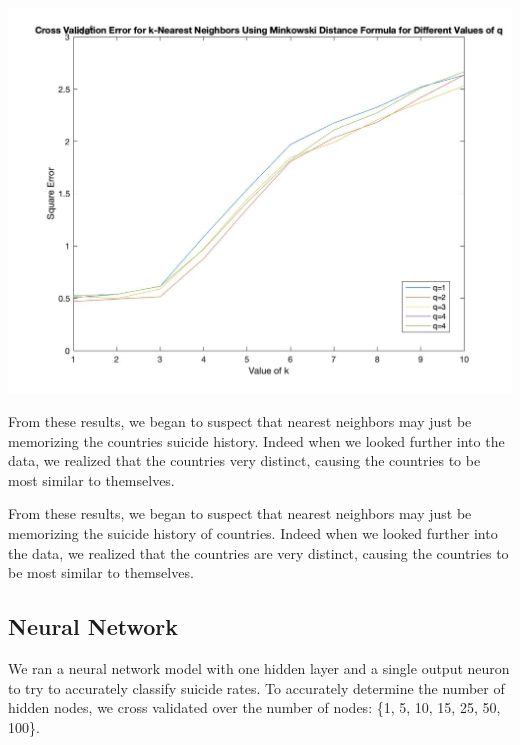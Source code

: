 \documentclass{article}
\begin{document}
\begin{multicols}{2}
\begingroup
    \includegraphics[width=\columnwidth]{../Figures/k_nn_err_cv_minkowski.jpg}
    \begin{spacing}{1.2}
    \label{fig:a} 
    \end{spacing}
\endgroup


From these results, we began to suspect that nearest neighbors may just be memorizing the countries suicide history. Indeed when we looked further into the data, we realized that the countries very distinct, causing the countries to be most similar to themselves.

From these results, we began to suspect that nearest neighbors may just be memorizing the suicide history of countries. Indeed when we looked further into the data, we realized that the countries are very distinct, causing the countries to be most similar to themselves.

\subsection{Neural Network} We ran a neural network model with one hidden layer and a single output neuron to try to accurately classify suicide rates. To accurately determine the number of hidden nodes, we cross validated over the number of nodes: \{1, 5, 10, 15, 25, 50, 100\}. 


\end{multicols}
\end{document}
